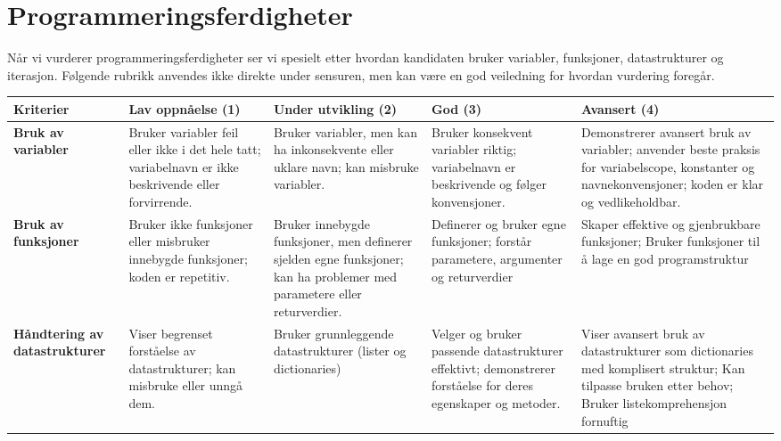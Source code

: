 \documentclass[12pt, titlepage]{article}
\begin{document}
\section*{Programmeringsferdigheter}
Når vi vurderer programmeringsferdigheter ser vi spesielt etter hvordan kandidaten bruker variabler, funksjoner, datastrukturer og iterasjon.
Følgende rubrikk anvendes ikke direkte under sensuren, men kan være en god veiledning for hvordan vurdering foregår.
\begin{landscape}

\tiny
\begin{table}[h!]
\centering
\begin{tabular}{p{4cm} | p{4cm} | p{4cm} | p{4cm} | p{4cm}}
\toprule
\textbf{Kriterier} & \textbf{Lav oppnåelse (1)} & \textbf{Under utvikling (2)} & \textbf{God (3)} & \textbf{Avansert (4)} \\
\midrule

\textbf{Bruk av variabler} & 
Bruker variabler feil eller ikke i det hele tatt; variabelnavn er ikke beskrivende eller forvirrende. &
Bruker variabler, men kan ha inkonsekvente eller uklare navn; kan misbruke variabler. &
Bruker konsekvent variabler riktig; variabelnavn er beskrivende og følger konvensjoner. &
Demonstrerer avansert bruk av variabler; anvender beste praksis for variabelscope, konstanter og navnekonvensjoner; koden er klar og vedlikeholdbar. \\

\midrule

\textbf{Bruk av funksjoner} &
Bruker ikke funksjoner eller misbruker innebygde funksjoner; koden er repetitiv. &
Bruker innebygde funksjoner, men definerer sjelden egne funksjoner; kan ha problemer med parametere eller returverdier. &
Definerer og bruker egne funksjoner; forstår parametere, argumenter og returverdier&
Skaper effektive og gjenbrukbare funksjoner; Bruker funksjoner til å lage en god programstruktur \\

\midrule

\textbf{Håndtering av datastrukturer} &
Viser begrenset forståelse av datastrukturer; kan misbruke eller unngå dem. &
   Bruker grunnleggende datastrukturer (lister og dictionaries) &
Velger og bruker passende datastrukturer effektivt; demonstrerer forståelse for deres egenskaper og metoder. &
Viser avansert bruk av datastrukturer som dictionaries med komplisert struktur; Kan tilpasse bruken etter behov; Bruker listekomprehensjon fornuftig \\


\end{tabular}
\end{table}
\end{landscape}
\end{document}
